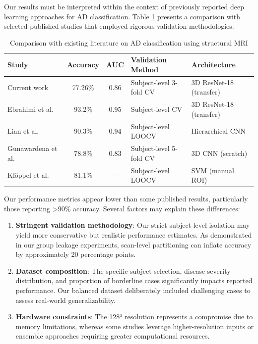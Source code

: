 \documentclass[12pt, a4paper]{article}
\begin{document}
Our results must be interpreted within the context of previously reported deep learning approaches for AD classification. Table \ref{tab:literature_comparison} presents a comparison with selected published studies that employed rigorous validation methodologies.

\begin{table}[htbp]
\centering
\begin{tabular}{|l|c|c|p{2.5cm}|p{2.5cm}|}
\hline
\textbf{Study} & \textbf{Accuracy} & \textbf{AUC} & \textbf{Validation Method} & \textbf{Architecture} \\
\hline
Current work & 77.26\% & 0.86 & Subject-level 3-fold CV & 3D ResNet-18 (transfer) \\
\hline
Ebrahimi et al.~\cite{ebrahimi2019transfer} & 93.2\% & 0.95 & Subject-level CV & 3D ResNet-18 (transfer) \\
\hline
Lian et al.~\cite{lian2018hierarchical} & 90.3\% & 0.94 & Subject-level LOOCV & Hierarchical CNN \\
\hline
Gunawardena et al.~\cite{gunawardena2017applying} & 78.8\% & 0.83 & Subject-level 5-fold CV & 3D CNN (scratch) \\
\hline
Klöppel et al.~\cite{kloppel2008accuracy} & 81.1\% & - & Subject-level LOOCV & SVM (manual ROI) \\
\hline
\end{tabular}
\caption{Comparison with existing literature on AD classification using structural MRI}
\label{tab:literature_comparison}
\end{table}


Our performance metrics appear lower than some published results, particularly those reporting >90\% accuracy. Several factors may explain these differences:

\begin{enumerate}
    \item \textbf{Stringent validation methodology}: Our strict subject-level isolation may yield more conservative but realistic performance estimates. As demonstrated in our group leakage experiments, scan-level partitioning can inflate accuracy by approximately 20 percentage points.
    
    \item \textbf{Dataset composition}: The specific subject selection, disease severity distribution, and proportion of borderline cases significantly impacts reported performance. Our balanced dataset deliberately included challenging cases to assess real-world generalizability.
    
    \item \textbf{Hardware constraints}: The 128³ resolution represents a compromise due to memory limitations, whereas some studies leverage higher-resolution inputs or ensemble approaches requiring greater computational resources.
\end{enumerate}
\end{document}
